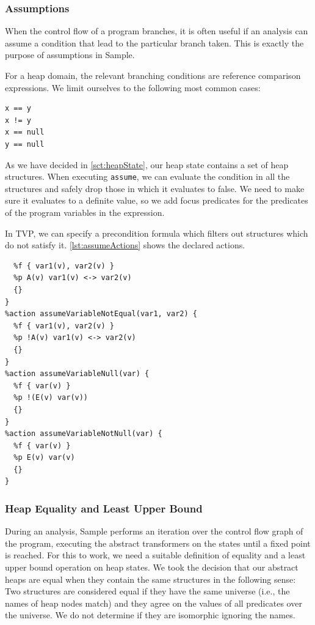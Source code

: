 \documentclass[11pt,a4paper,english]{article}
\begin{document}
\subsubsection{Assumptions} 
When the control flow of a program branches, it is often useful if an analysis
can assume a condition that lead to the particular branch taken. This is exactly
the purpose of assumptions in Sample.

For a heap domain, the relevant branching conditions are reference comparison
expressions. We limit ourselves to the following most common cases:

\begin{lstlisting}[caption={Implemented Assumptions for the heap domain},label=lst:assumeExpressions]
x == y
x != y
x == null
y == null
\end{lstlisting}

As we have decided in \autoref{sct:heapState}, our heap state contains a set of
heap structures. When executing \texttt{assume}, we can evaluate the condition
in all the structures and safely drop those in which it evaluates to false. We
need to make sure it evaluates to a definite value, so we add focus predicates
for the predicates of the program variables in the expression.

In TVP, we can specify a precondition formula which filters out structures which
do not satisfy it. \autoref{lst:assumeActions} shows the declared actions.

\begin{lstlisting}[language=tvp,caption={Actions for Assume},label=lst:assumeActions]
%action assumeVariableEqual(var1, var2) {
  %f { var1(v), var2(v) }
  %p A(v) var1(v) <-> var2(v)
  {}
}
%action assumeVariableNotEqual(var1, var2) {
  %f { var1(v), var2(v) }
  %p !A(v) var1(v) <-> var2(v)
  {}
}
%action assumeVariableNull(var) {
  %f { var(v) }
  %p !(E(v) var(v))
  {}
}
%action assumeVariableNotNull(var) {
  %f { var(v) }
  %p E(v) var(v)
  {}
}
\end{lstlisting}



\subsubsection{Heap Equality and Least Upper Bound} 
During an analysis, Sample performs an iteration over the control flow graph of
the program, executing the abstract transformers on the states until a fixed
point is reached. For this to work, we need a suitable definition of equality
and a least upper bound operation on heap states. We took the decision that our
abstract heaps are equal when they contain the same structures in the following
sense: Two structures are considered equal if they have the same universe (i.e.,
the names of heap nodes match) and they agree on the values of all predicates
over the universe. We do not determine if they are isomorphic ignoring the
names. 
\end{document}

